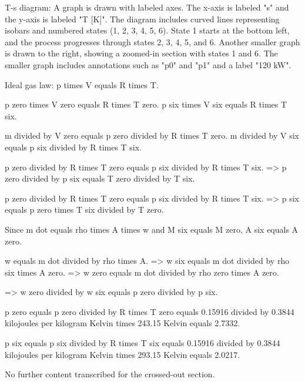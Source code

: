 T-s diagram:  
A graph is drawn with labeled axes. The x-axis is labeled "s" and the y-axis is labeled "T [K]". The diagram includes curved lines representing isobars and numbered states (1, 2, 3, 4, 5, 6). State 1 starts at the bottom left, and the process progresses through states 2, 3, 4, 5, and 6. Another smaller graph is drawn to the right, showing a zoomed-in section with states 1 and 6. The smaller graph includes annotations such as "p0" and "p1" and a label "120 kW".

Ideal gas law:  
p times V equals R times T.  

p zero times V zero equals R times T zero.  
p six times V six equals R times T six.  

m divided by V zero equals p zero divided by R times T zero.  
m divided by V six equals p six divided by R times T six.  

p zero divided by R times T zero equals p six divided by R times T six.  
=> p zero divided by p six equals T zero divided by T six.  

p zero divided by R times T zero equals p six divided by R times T six.  
=> p six equals p zero times T six divided by T zero.  

Since m dot equals rho times A times w and M six equals M zero, A six equals A zero.  

w equals m dot divided by rho times A.  
=> w six equals m dot divided by rho six times A zero.  
=> w zero equals m dot divided by rho zero times A zero.  

=> w zero divided by w six equals p zero divided by p six.  

p zero equals p zero divided by R times T zero equals 0.15916 divided by 0.3844 kilojoules per kilogram Kelvin times 243.15 Kelvin equals 2.7332.  

p six equals p six divided by R times T six equals 0.15916 divided by 0.3844 kilojoules per kilogram Kelvin times 293.15 Kelvin equals 2.0217.  

No further content transcribed for the crossed-out section.